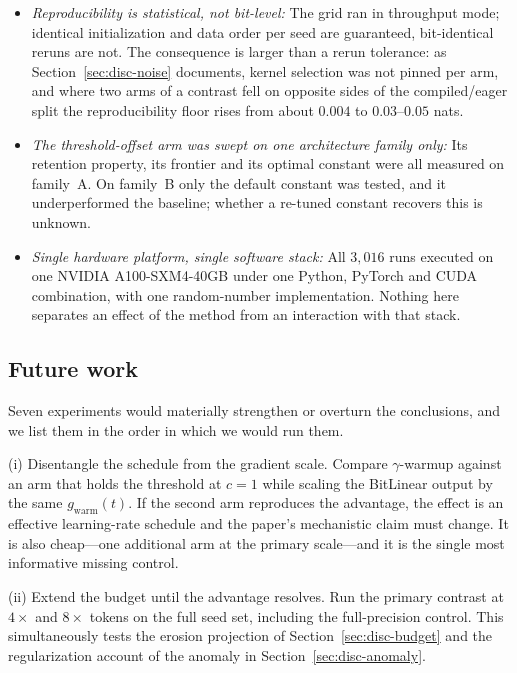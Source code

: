 \documentclass[final,5p,times,twocolumn]{elsarticle}
\theoremstyle{remark}
\begin{document}
\begin{itemize}
\item[] \textit{Reproducibility is statistical, not bit-level:} The grid ran in
throughput mode; identical initialization and data order per seed are
guaranteed, bit-identical reruns are not. The consequence is larger than a
rerun tolerance: as Section~\ref{sec:disc-noise} documents, kernel selection
was not pinned per arm, and where two arms of a contrast fell on opposite
sides of the compiled/eager split the reproducibility floor rises from about
$0.004$ to $0.03$--$0.05$ nats.

\item[] \textit{The threshold-offset arm was swept on one architecture family
only:} Its retention property, its frontier and its optimal constant were all
measured on family~A. On family~B only the default constant was tested, and it
underperformed the baseline; whether a re-tuned constant recovers this is
unknown.

\item[] \textit{Single hardware platform, single software stack:}
All $3{,}016$ runs executed on one NVIDIA A100-SXM4-40GB under one Python,
PyTorch and CUDA combination, with one random-number implementation. Nothing
here separates an effect of the method from an interaction with that stack.
\end{itemize}

\subsection{Future work}
\label{sec:disc-future}

Seven experiments would materially strengthen or overturn the conclusions, and
we list them in the order in which we would run them.

(i) Disentangle the schedule from the gradient scale. Compare
$\gamma$-warmup against an arm that holds the threshold at $c = 1$ while
scaling the BitLinear output by the same $g_{\mathrm{warm}}(t)$. If the second
arm reproduces the advantage, the effect is an effective learning-rate schedule
and the paper's mechanistic claim must change. It is also cheap---one
additional arm at the primary scale---and it is the single most informative
missing control.

(ii) Extend the budget until the advantage resolves. Run the primary
contrast at $4\times$ and $8\times$ tokens on the full seed set, including the
full-precision control. This simultaneously tests the erosion projection of
Section~\ref{sec:disc-budget} and the regularization account of the anomaly in
Section~\ref{sec:disc-anomaly}.
\end{document}

